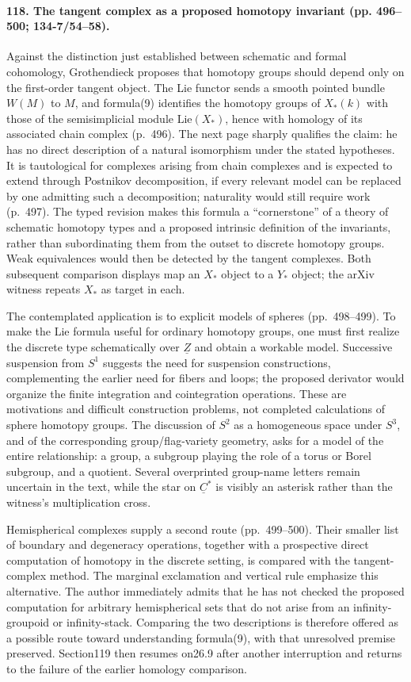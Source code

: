 \paragraph{118. The tangent complex as a proposed homotopy invariant (pp. 496--500; 134-7/54--58).}
Against the distinction just established between schematic and formal cohomology, Grothendieck proposes that homotopy groups should depend only on the first-order tangent object. The Lie functor sends a smooth pointed bundle $W(M)$ to $M$, and formula(9) identifies the homotopy groups of $X_*(k)$ with those of the semisimplicial module $\mathrm{Lie}(X_*)$, hence with homology of its associated chain complex (p.~496). The next page sharply qualifies the claim: he has no direct description of a natural isomorphism under the stated hypotheses. It is tautological for complexes arising from chain complexes and is expected to extend through Postnikov decomposition, if every relevant model can be replaced by one admitting such a decomposition; naturality would still require work (p.~497). The typed revision makes this formula a ``cornerstone'' of a theory of schematic homotopy types and a proposed intrinsic definition of the invariants, rather than subordinating them from the outset to discrete homotopy groups. Weak equivalences would then be detected by the tangent complexes. Both subsequent comparison displays map an $X_*$ object to a $Y_*$ object; the arXiv witness repeats $X_*$ as target in each.

The contemplated application is to explicit models of spheres (pp.~498--499). To make the Lie formula useful for ordinary homotopy groups, one must first realize the discrete type schematically over $\underline Z$ and obtain a workable model. Successive suspension from $S^1$ suggests the need for suspension constructions, complementing the earlier need for fibers and loops; the proposed derivator would organize the finite integration and cointegration operations. These are motivations and difficult construction problems, not completed calculations of sphere homotopy groups. The discussion of $S^2$ as a homogeneous space under $S^3$, and of the corresponding group/flag-variety geometry, asks for a model of the entire relationship: a group, a subgroup playing the role of a torus or Borel subgroup, and a quotient. Several overprinted group-name letters remain uncertain in the text, while the star on $\underline C^*$ is visibly an asterisk rather than the witness's multiplication cross.

Hemispherical complexes supply a second route (pp.~499--500). Their smaller list of boundary and degeneracy operations, together with a prospective direct computation of homotopy in the discrete setting, is compared with the tangent-complex method. The marginal exclamation and vertical rule emphasize this alternative. The author immediately admits that he has not checked the proposed computation for arbitrary hemispherical sets that do not arise from an infinity-groupoid or infinity-stack. Comparing the two descriptions is therefore offered as a possible route toward understanding formula(9), with that unresolved premise preserved. Section119 then resumes on26.9 after another interruption and returns to the failure of the earlier homology comparison.
